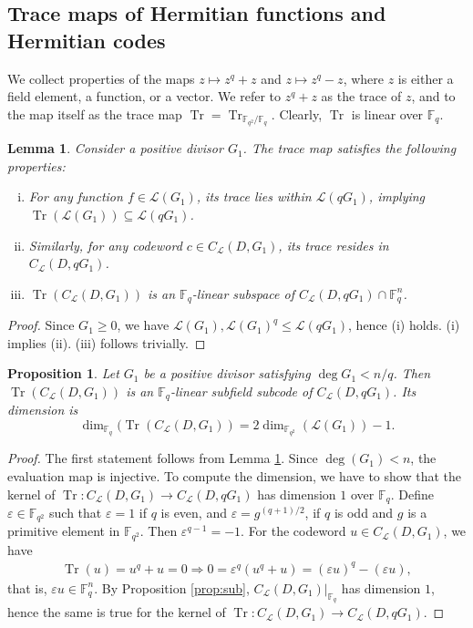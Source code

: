 \documentclass[11pt]{amsart}
\theoremstyle{plain}
\newtheorem{lemma}[theorem]{Lemma}
\newtheorem{proposition}[theorem]{Proposition}
\theoremstyle{definition}
\theoremstyle{remark}
\DeclareMathOperator{\trace}{Tr}
\begin{document}
\subsection{Trace maps of Hermitian functions and Hermitian codes}
We collect properties of the maps $z\mapsto z^q+z$ and $z\mapsto z^q-z$, where $z$ is either a field element, a function, or a vector. We refer to $z^q+z$ as the trace of $z$, and to the map itself as the trace map $\trace = \trace_{\mathbb{F}_{q^2} / \mathbb{F}_q}$. Clearly, $\trace$ is linear over $\mathbb{F}_q$. 

\begin{lemma} \label{lm:trace-code-props}
	Consider a positive divisor $G_1$. The trace map satisfies the following properties:
	\begin{enumerate}[(i)]
		\item For any function $f \in \mathscr{L}(G_1)$, its trace lies within $\mathscr{L}(qG_1)$, implying $\trace(\mathscr{L}(G_1)) \subseteq \mathscr{L}(qG_1)$.
		\item Similarly, for any codeword $c \in C_{\mathcal{L}}(D,G_1)$, its trace resides in $C_{\mathcal{L}}(D,qG_1)$. 
		\item $\trace(C_{\mathcal{L}}(D,G_1))$ is an $\mathbb{F}_q$-linear subspace of $C_{\mathcal{L}}(D,qG_1) \cap \mathbb{F}_q^n$.
	\end{enumerate}
\end{lemma}
\begin{proof}
Since $G_1\geq 0$, we have $\mathscr{L}(G_1), \mathscr{L}(G_1)^q \leq \mathscr{L}(qG_1)$, hence (i) holds. (i) implies (ii). (iii) follows trivially.
\end{proof}

\begin{proposition}
	Let $G_1$ be a positive divisor satisfying $\deg G_1 < n/q$. Then $\trace (C_{\mathcal{L}}(D,G_1))$ is an $\mathbb{F}_q$-linear subfield subcode of $C_{\mathcal{L}}(D,qG_1)$. Its dimension is
	\[ \dim_{\mathbb{F}_q}(\trace (C_{\mathcal{L}}(D,G_1)) = 2\dim_{\mathbb{F}_{q^2}}(\mathscr{L}(G_1))-1. \]
\end{proposition}
\begin{proof}
The first statement follows from Lemma \ref{lm:trace-code-props}. Since $\deg(G_1)<n$, the evaluation map is injective. To compute the dimension, we have to show that the kernel of $\trace: C_{\mathcal{L}}(D,G_1) \to C_{\mathcal{L}}(D,qG_1)$ has dimension $1$ over $\mathbb{F}_q$. Define $\varepsilon\in \mathbb{F}_{q^2}$ such that $\varepsilon=1$ if $q$ is even, and $\varepsilon=g^{(q+1)/2}$, if $q$ is odd and $g$ is a primitive element in $\mathbb{F}_{q^2}$. Then $\varepsilon^{q-1}=-1$. For the codeword $u\in C_{\mathcal{L}}(D,G_1)$, we have
\begin{align*}
\trace(u)=u^q+u=0 \Longrightarrow 0 = \varepsilon^q(u^q+u) = (\varepsilon u)^q-(\varepsilon u),
\end{align*}
that is, $\varepsilon u \in \mathbb{F}_q^n$. By Proposition \ref{prop:sub}, $C_{\mathcal{L}}(D,G_1)|_{\mathbb{F}_q}$ has dimension $1$, hence the same is true for the kernel of  $\trace: C_{\mathcal{L}}(D,G_1) \to C_{\mathcal{L}}(D,qG_1)$. 
\end{proof}
\end{document}
